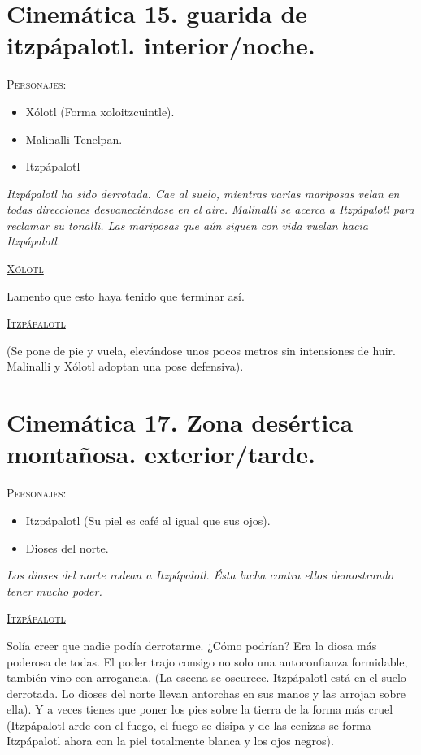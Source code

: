 \documentclass[11pt,letterpaper]{article}
\begin{document}
 \section{Cinemática 15. guarida de itzpápalotl. interior/noche.}
  \textsc{Personajes}:
  \begin{itemize}
   \item Xólotl (Forma xoloitzcuintle).
	\item Malinalli Tenelpan.
	\item Itzpápalotl
  \end{itemize}
\textit{Itzpápalotl ha sido derrotada. Cae al suelo, mientras varias mariposas velan en todas direcciones desvaneciéndose en el aire. Malinalli se acerca a Itzpápalotl para reclamar su tonalli. Las mariposas que aún siguen con vida vuelan hacia Itzpápalotl.}
\begin{center}
\textsc{\underline{Xólotl}}
\\
\par
Lamento que esto haya tenido que terminar así.
\\
\par
\textsc{\underline{Itzpápalotl}}
\\
\par 
(Se pone de pie y vuela, elevándose unos pocos metros sin intensiones de huir. Malinalli y Xólotl adoptan una pose defensiva).
\end{center}

\section{Cinemática 17. Zona desértica montañosa. exterior/tarde.}
\textsc{Personajes}:
\begin{itemize}
\item Itzpápalotl (Su piel es café al igual que sus ojos).
\item Dioses del norte.
\end{itemize}
\textit{Los dioses del norte rodean a Itzpápalotl. Ésta lucha contra ellos demostrando tener mucho poder.}
\begin{center}
\textsc{\underline{Itzpápalotl}}
\\
\par
Solía creer que nadie podía derrotarme. ¿Cómo podrían? Era la diosa más poderosa de todas. El poder trajo consigo no solo una autoconfianza formidable, también vino con arrogancia. (La escena se oscurece. Itzpápalotl está en el suelo derrotada. Lo dioses del norte llevan antorchas en sus manos y las arrojan sobre ella). Y a veces tienes que poner los pies sobre la tierra de la forma más cruel (Itzpápalotl arde con el fuego, el fuego se disipa y de las cenizas se forma Itzpápalotl ahora con la piel totalmente blanca y los ojos negros). 
\end{center}
\end{document}
